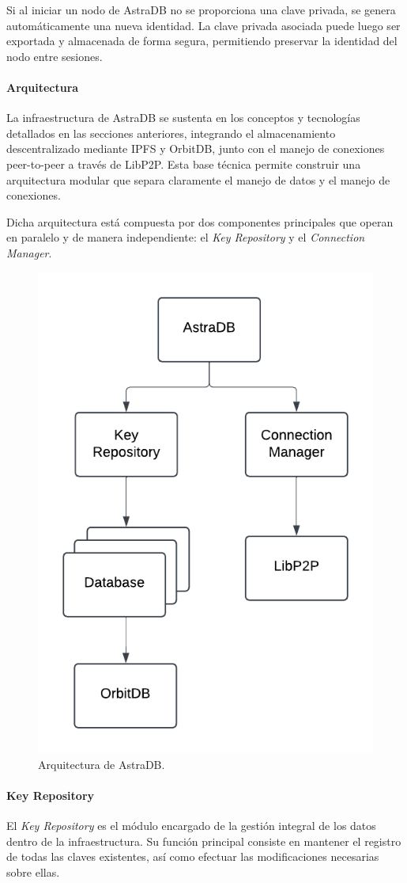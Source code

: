 Si al iniciar un nodo de AstraDB no se proporciona una clave privada, se genera automáticamente una nueva identidad. La clave privada asociada puede luego ser exportada y almacenada de forma segura, permitiendo preservar la identidad del nodo entre sesiones.

\paragraph{Arquitectura}

La infraestructura de AstraDB se sustenta en los conceptos y tecnologías detallados en las secciones anteriores, integrando el almacenamiento descentralizado mediante IPFS y OrbitDB, junto con el manejo de conexiones peer-to-peer a través de LibP2P. Esta base técnica permite construir una arquitectura modular que separa claramente el manejo de datos y el manejo de conexiones.

Dicha arquitectura está compuesta por dos componentes principales que operan en paralelo y de manera independiente: el \textit{Key Repository} y el \textit{Connection Manager}.

\begin{figure}[H]
\centering
\includegraphics[width=0.5\linewidth]{img/solucion-ipfs/astradb-arquitectura.png}
\caption{Arquitectura de AstraDB.}
\label{fig:astradb-arquitectura}
\end{figure}

\paragraph{Key Repository}

El \textit{Key Repository} es el módulo encargado de la gestión integral de los datos dentro de la infraestructura. Su función principal consiste en mantener el registro de todas las claves existentes, así como efectuar las modificaciones necesarias sobre ellas.

